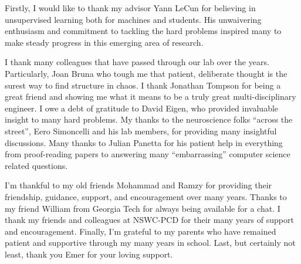 Firstly, I would like to thank my advisor Yann LeCun for believing in
unsupervised learning both for machines and students. His unwaivering
enthusiasm and commitment to tackling the hard problems inspired many to make
steady progress in this emerging area of research.

I thank many colleagues that have passed through our lab over the years.
Particularly, Joan Bruna who tough me that patient, deliberate thought is the
surest way to find structure in chaos.  I thank Jonathan Tompson for being a
great friend and showing me what it means to be a truly great
multi-disciplinary engineer.  I owe a debt of gratitude to David Eigen, who
provided invaluable insight to many hard problems. My thanks to the
neuroscience folks ``across the street'', Eero Simoncelli and his lab members,
for providing many insightful discussions. Many thanks to Julian Panetta for
his patient help in everything from proof-reading papers to answering many
``embarrassing'' computer science related questions.  
      
I'm thankful to my old friends Mohammad and Ramzy for providing their
friendship, guidance, support, and encouragement over many years.  
Thanks to my friend William from Georgia Tech for always being available for a chat.  
I thank my friends and colleagues at NSWC-PCD for their many years of support and
encouragement. Finally, I'm grateful to my parents who have remained patient
and supportive through my many years in school.  Last, but certainly not least,
thank you Emer for your loving support.  

 
